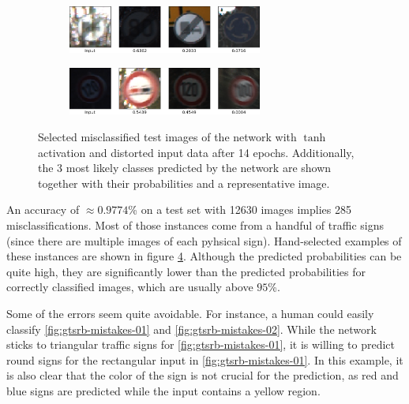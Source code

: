 \documentclass[11pt, a4paper]{article}
\begin{document}
\begin{figure}
\begin{subfigure}{\textwidth}
		\label{fig:gtsrb-mistakes-05}
	\end{subfigure}
	\begin{subfigure}{\textwidth}
		\centering
		\caption{}
		\includegraphics[width=0.7\textwidth]{gtsrb_mistakes/mistake_ueberholen_lkw.png}
		\label{fig:gtsrb-mistakes-06}
	\end{subfigure}
	\begin{subfigure}{\textwidth}
		\centering
		\caption{}
		\includegraphics[width=0.7\textwidth]{gtsrb_mistakes/mistake_limit_120.png}
		\label{fig:gtsrb-mistakes-07}
	\end{subfigure}
	\caption{Selected misclassified test images of the network with $\tanh$ activation and distorted input data after 14 epochs. Additionally, the 3 most likely classes predicted by the network are shown together with their probabilities and a representative image.}
	\label{fig:gtsrb-mistakes}
\end{figure}

An accuracy of $\approx 0.9774$\% on a test set with 12630 images implies 285 misclassifications. Most of those instances come from a handful of traffic signs (since there are multiple images of each pyhsical sign). Hand-selected examples of these instances are shown in figure \ref{fig:gtsrb-mistakes}. Although the predicted probabilities can be quite high, they are significantly lower than the predicted probabilities for correctly classified images, which are usually above $95$\%.

Some of the errors seem quite avoidable. For instance, a human could easily classify \ref{fig:gtsrb-mistakes-01} and \ref{fig:gtsrb-mistakes-02}. While the network sticks to triangular traffic signs for \ref{fig:gtsrb-mistakes-01}, it is willing to predict round signs for the rectangular input in \ref{fig:gtsrb-mistakes-01}. In this example, it is also clear that the color of the sign is not crucial for the prediction, as red and blue signs are predicted while the input contains a yellow region.
\end{document}

